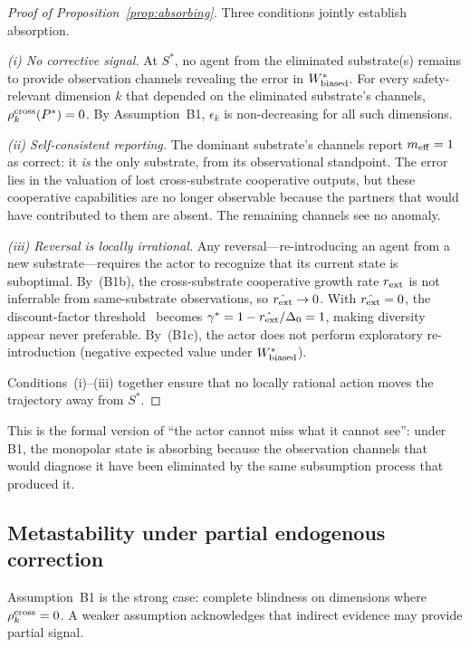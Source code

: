 \begin{proof}[Proof of Proposition~\ref{prop:absorbing}]
Three conditions jointly establish absorption.

\emph{(i) No corrective signal.}
At $S^*$, no agent from the eliminated substrate(s) remains to provide
observation channels revealing the error in $W^*_{\mathrm{biased}}$.
For every safety-relevant dimension $k$ that depended on the eliminated
substrate's channels, $\rho^{\mathrm{cross}}_k(P^*) = 0$.  By Assumption~B1,
$\epsilon_k$ is non-decreasing for all such dimensions.

\emph{(ii) Self-consistent reporting.}
The dominant substrate's channels report $m_{\mathrm{eff}} = 1$ as correct: it
\emph{is} the only substrate, from its observational standpoint.  The
error lies in the valuation of lost cross-substrate cooperative
outputs, but these cooperative capabilities are no longer observable
because the partners that would have contributed to them are absent.
The remaining channels see no anomaly.

\emph{(iii) Reversal is locally irrational.}
Any reversal---re-introducing an agent from a new substrate---requires
the actor to recognize that its current state is suboptimal.  By~(B1b),
the cross-substrate cooperative growth rate $r_{\mathrm{ext}}$ is not inferrable
from same-substrate observations, so $\hat{r_{\mathrm{ext}}} \to 0$.  With
$\hat{r_{\mathrm{ext}}} = 0$, the discount-factor threshold~\citep{lasser2026horizon} becomes
$\gamma^* = 1 - \hat{r_{\mathrm{ext}}}/\Delta_0 = 1$, making diversity appear
never preferable.  By~(B1c), the actor does not perform exploratory
re-introduction (negative expected value under $W^*_{\mathrm{biased}}$).

Conditions~(i)--(iii) together ensure that no locally rational action
moves the trajectory away from $S^*$.
\end{proof}

This is the formal version of ``the actor cannot miss what it cannot
see'': under B1, the monopolar state is absorbing because the
observation channels that would diagnose it have been eliminated by the
same subsumption process that produced it.

\subsection{Metastability under partial endogenous correction}

Assumption~B1 is the strong case: complete blindness on dimensions where
$\rho^{\mathrm{cross}}_k = 0$.  A weaker assumption acknowledges that indirect
evidence may provide partial signal.


